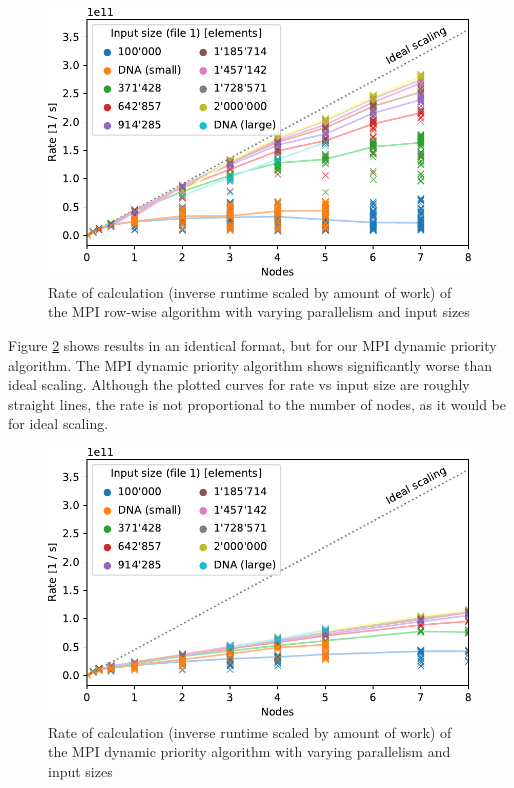 \begin{figure}[hbt]\centering
  \includegraphics[width=\linewidth]{images/scaling-rate-mpi-row-wise.pdf}
  \caption{Rate of calculation (inverse runtime scaled by amount of work) of the MPI row-wise algorithm with varying parallelism and input sizes}
  \label{results_scaling_rate_mpi_row_wise}
\end{figure}

Figure \ref{results_scaling_rate_mpi_dynamic_priority} shows results in an identical format, but for our MPI dynamic priority algorithm. The MPI dynamic priority algorithm shows significantly worse than ideal scaling. Although the plotted curves for rate vs input size are roughly straight lines, the rate is not proportional to the number of nodes, as it would be for ideal scaling.

\begin{figure}[hbt]\centering
  \includegraphics[width=\linewidth]{images/scaling-rate-mpi-dynamic-priority.pdf}
  \caption{Rate of calculation (inverse runtime scaled by amount of work) of the MPI dynamic priority algorithm with varying parallelism and input sizes}
  \label{results_scaling_rate_mpi_dynamic_priority}
\end{figure}


